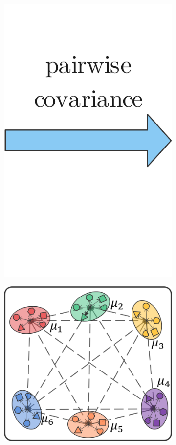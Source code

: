 \begin{figure}[htbp]
\begin{subfigure}{0.15\textwidth}
                \includegraphics[width=1.0\linewidth]{figs/pc.png}
            \end{subfigure}%
            \begin{subfigure}{0.3\textwidth}
                \centering
                \includegraphics[width=0.95\linewidth]{figs/pc-MvDA.png}

\end{subfigure}
\end{figure}
